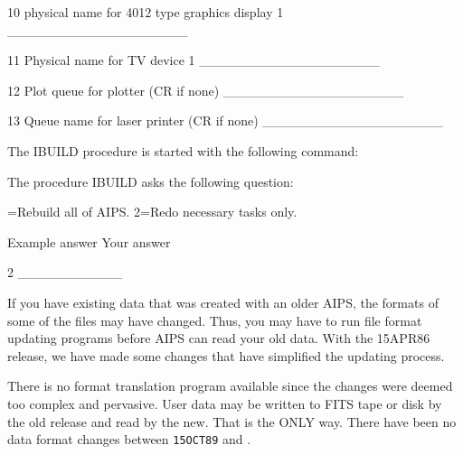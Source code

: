 10 physical name for 4012 type graphics display 1   ___________________

11 Physical name for TV device 1                    ___________________

12 Plot queue for plotter (CR if none)              ___________________

13 Queue name for laser printer (CR if none)        ___________________

\endfortran\medskip

\noindent
The IBUILD procedure is started with the following command:\medskip

\medskip

\noindent
The procedure IBUILD asks the following question:\medskip

=Rebuild all of AIPS.  2=Redo necessary tasks only.

Example answer          Your answer

2                       ___________
\endfortran\medskip

\bigskip{}

\medskip{}

If you have existing data that was created with an older AIPS, the
formats of some of the files may have changed.  Thus, you may have to
run file format updating programs before AIPS can read your old data.
With the 15APR86 release, we have made some changes that have
simplified the updating process.

\medskip{}

There is no format translation program available since the changes were
deemed too complex and pervasive.  User data may be written to FITS
tape or disk by the old release and read by the new.  That is the ONLY
way.  There have been no data format changes between {\tt 15OCT89} and
\THISVER. 


